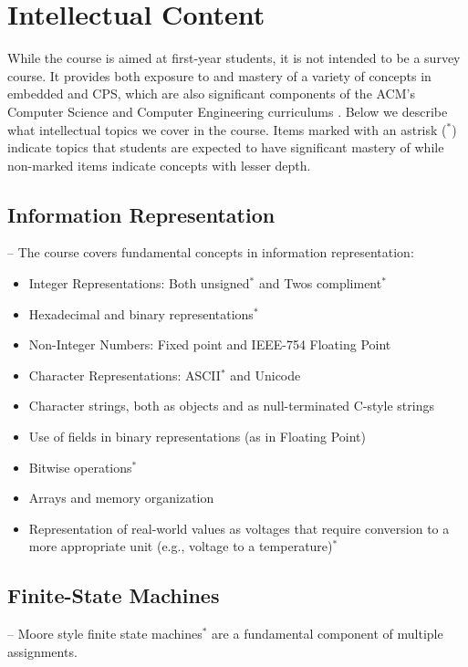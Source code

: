 \section{Intellectual Content}
\label{sec:topics}

While the course is aimed at first-year students, it is not intended to be a survey course.  It provides both exposure to and mastery of a variety of concepts in embedded and CPS, which are also significant components of the ACM's Computer Science and Computer Engineering curriculums \cite{cs13, ce16}.  Below we describe what intellectual topics we cover in the course.  Items marked with an astrisk ($^*$)   indicate topics that students are expected to have significant mastery of while non-marked items indicate concepts with lesser depth.

\subsection{Information Representation} --
\label{sec:ip}
The course covers fundamental concepts in information representation:
\begin{itemize}
  \item Integer Representations: Both unsigned$^*$ and Twos compliment$^*$
  \item Hexadecimal and binary representations$^*$
  \item Non-Integer Numbers: Fixed point and IEEE-754 Floating Point
  \item Character Representations: ASCII$^*$ and Unicode
  \item Character strings, both as objects and as null-terminated C-style strings
  \item Use of fields in binary representations (as in Floating Point)
  \item Bitwise operations$^*$
  \item Arrays and memory organization
  \item Representation of real-world values as voltages that require conversion to a more appropriate unit (e.g., voltage to a temperature)$^*$
\end{itemize}

\subsection{Finite-State Machines} --
\label{sec:fsm}
Moore style finite state machines$^*$ are a fundamental component of multiple assignments.

